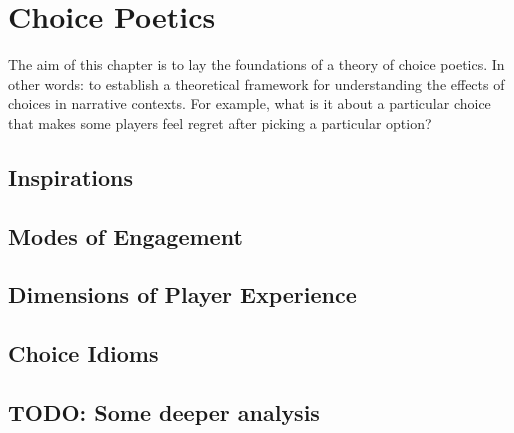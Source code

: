 \chapter{Choice Poetics}

\label{ch:choice-poetics}

The aim of this chapter is to lay the foundations of a theory of choice poetics.
%
In other words: to establish a theoretical framework for understanding the effects of choices in narrative contexts.
%
For example, what is it about a particular choice that makes some players feel regret after picking a particular option?







\section{Inspirations}

\cite{Carr2009}
\cite{Bizzocchi2011}


\section{Modes of Engagement}


\section{Dimensions of Player Experience}


\section{Choice Idioms}


\section{TODO: Some deeper analysis}
